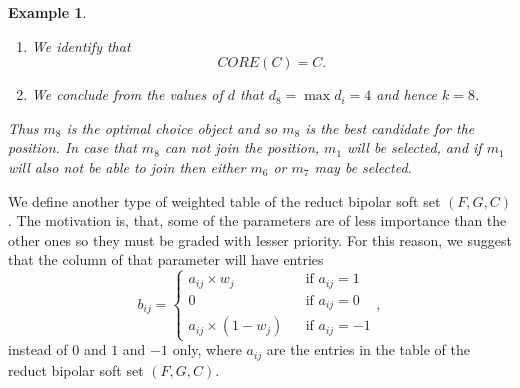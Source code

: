 \documentclass{amsart}
\theoremstyle{plain}
\newtheorem{example}{Example}
\numberwithin{equation}{section}
\begin{document}
\begin{example}
\begin{enumerate}
\begin{table}[h]
\begin{tabular}{||l||l|l|l|l|l|l|l|}
\multicolumn{1}{|r|}{$0$} & \multicolumn{1}{|r|}{$-1$} & 
\multicolumn{1}{|r|}{$-1$} & \multicolumn{1}{|r|}{$0$} & 
\multicolumn{1}{|r|}{$0$} \\ \hline
$m_{5}$ & \multicolumn{1}{||r|}{$1$} & \multicolumn{1}{|r|}{$0$} & 
\multicolumn{1}{|r|}{$0$} & \multicolumn{1}{|r|}{$-1$} & 
\multicolumn{1}{|r|}{$1$} & \multicolumn{1}{|r|}{$-1$} & 
\multicolumn{1}{|r|}{$0$} \\ \hline\hline
$m_{3}$ & \multicolumn{1}{||r|}{$0$} & \multicolumn{1}{|r|}{$0$} & 
\multicolumn{1}{|r|}{$-1$} & \multicolumn{1}{|r|}{$-1$} & 
\multicolumn{1}{|r|}{$-1$} & \multicolumn{1}{|r|}{$0$} & 
\multicolumn{1}{|r|}{$-3$} \\ \hline
\end{tabular}\caption{Table obtained after rearrangement of Rows according to the values
of d}\label{TableKey copy(5)}\end{table}
\item We identify that\begin{equation*}
CORE(C)=C\text{.}
\end{equation*}

\item We conclude from the values of $d$ that $d_{8}=\max d_{i}=4$ and hence 
$k=8$.
\end{enumerate}

Thus $m_{8}$ is the optimal choice object and so $m_{8}$ is the best
candidate for the position. In case that $m_{8}$ can not join the position, $m_{1}$ will be selected, and if $m_{1}$ will also not be able to join then
either $m_{6}$ or $m_{7}$ may be selected.
\end{example}

We define another type of weighted table of the reduct bipolar soft set $(F,G,C)$. The motivation is, that, some of the parameters are of less
importance than the other ones so they must be graded with lesser priority.
For this reason, we suggest that the column of that parameter will have
entries 
\begin{equation*}
b_{ij}=\left\{ 
\begin{array}{lll}
a_{ij}\times w_{j} &  & \text{if }a_{ij}=1 \\ 
0 &  & \text{if }a_{ij}=0 \\ 
a_{ij}\times (1-w_{j}) &  & \text{if }a_{ij}=-1\end{array}\right. ,
\end{equation*}instead of $0$ and $1$ and $-1$ only, where $a_{ij}$ are the entries in the
table of the reduct bipolar soft set $(F,G,C)$.
\end{document}
